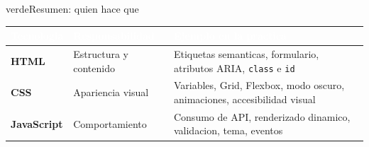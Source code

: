 \documentclass[11pt,a4paper]{article}
\begin{document}
	\begin{cajatip}{verde}{Resumen: quien hace que}
		\begin{center}
			\small
			\begin{tabular}{|L{2.5cm}|L{5cm}|L{6cm}|}
				\hline
				\textcolor{white}{\textbf{Tecnologia}} &
				\textcolor{white}{\textbf{Responsabilidad}} &
				\textcolor{white}{\textbf{Ejemplo en la practica}} \\
				\hline
				\textbf{HTML} & Estructura y contenido & Etiquetas semanticas, formulario, atributos ARIA, \texttt{class} e \texttt{id} \\
				\hline
				\textbf{CSS} & Apariencia visual & Variables, Grid, Flexbox, modo oscuro, animaciones, accesibilidad visual \\
				\hline
				\textbf{JavaScript} & Comportamiento & Consumo de API, renderizado dinamico, validacion, tema, eventos \\
				\hline
			\end{tabular}
		\end{center}
	\end{cajatip}
	
\end{document}
